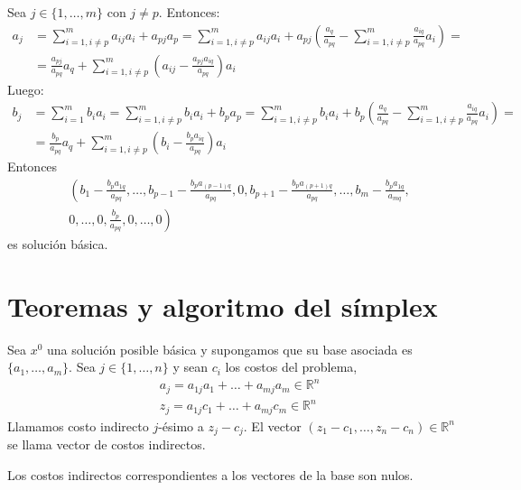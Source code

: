 Sea $j \in \{1, \dots, m\}$ con $j \neq p$.
Entonces:
\begin{align*}
    a_j & = \sum_{i=1, i \neq p}^m a_{ij}a_i + a_{pj}a_p = \sum_{i=1, i \neq p}^m a_{ij}a_i + a_{pj} \left(\frac{a_q}{a_{pq}} - \sum_{i=1, i \neq p}^m \frac{a_{iq}}{a_{pq}}a_i\right) = \\
        & = \frac{a_{pj}}{a_{pq}}a_q + \sum_{i=1, i \neq p}^m \left(a_{ij} - \frac{a_{pj}a_{iq}}{a_{pq}}\right)a_i
\end{align*}
Luego:
\begin{align*}
    b_j & = \sum_{i=1}^m b_ia_i = \sum_{i=1, i \neq p}^m b_ia_i + b_pa_p = \sum_{i=1, i \neq p}^m b_ia_i + b_p\left(\frac{a_q}{a_{pq}} - \sum_{i=1, i \neq p}^m \frac{a_{iq}}{a_{pq}}a_i\right) = \\
        & = \frac{b_p}{a_{pq}}a_q + \sum_{i=1, i \neq p}^m \left(b_i - \frac{b_pa_{iq}}{a_{pq}}\right)a_i
\end{align*}
Entonces
\begin{align*}
     & \left( b_1 - \frac{b_pa_{1q}}{a_{pq}}, \dots, b_{p-1} - \frac{b_pa_{(p-1)q}}{a_{pq}}, 0, b_{p+1} - \frac{b_pa_{(p+1)q}}{a_{pq}}, \dots, b_m - \frac{b_pa_{1q}}{a_{mq}}, \right. \\
     & \left. 0, \dots, 0, \frac{b_p}{a_{pq}}, 0, \dots, 0 \right)
\end{align*}
es solución básica.

\section{Teoremas y algoritmo del símplex}
\begin{definition}
    Sea $x^0$ una solución posible básica y supongamos que su base asociada es $\{a_1, \dots, a_m\}$.
    Sea $j \in \{1, \dots, n\}$ y sean $c_i$ los costos del problema,
    \begin{align*}
         & a_j = a_{1j}a_1 + \dots + a_{mj}a_m \in \mathbb{R}^n \\
         & z_j = a_{1j}c_1 + \dots + a_{mj}c_m \in \mathbb{R}^n
    \end{align*}
    Llamamos costo indirecto $j$-ésimo a $z_j - c_j$.
    El vector $(z_1-c_1, \dots, z_n-c_n) \in \mathbb{R}^n$ se llama vector de costos indirectos.
\end{definition}

\begin{remark}
    Los costos indirectos correspondientes a los vectores de la base son nulos.
\end{remark}

